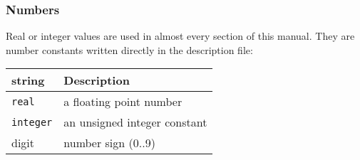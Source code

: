 \newpage
\subsubsection{Numbers}
\label{sec:numbers}
Real or integer values are used in almost every section of this manual.
They are number constants written directly in the description file: \\





\begin{tabularx}{\textwidth}{l|X}
string    & Description \\
\hline
\verb+real+    & a floating point number \\
\verb+integer+ & an unsigned integer constant \\
digit          & number sign (0..9) \\
\end{tabularx}
%



